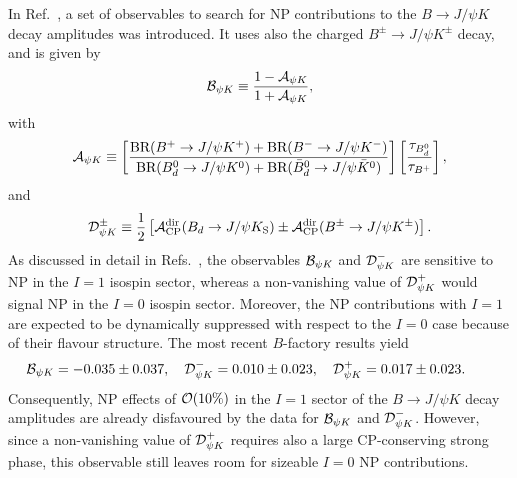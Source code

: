 \documentclass[12pt]{article}
\begin{document}
In Ref.~\cite{FM-BpsiK}, a set of observables to search for NP contributions to 
the $B\to J/\psi K $ decay amplitudes was introduced. It
uses also the charged $B^\pm\to J/\psi K^\pm$ decay, and is given by
\begin{equation}\label{BpsiK}
{\cal B}_{\psi K}\equiv \frac{1-{\cal A}_{\psi K}}{1+{\cal A}_{\psi K}}, 
\end{equation}
with
\begin{equation}\label{ApsiK-def}
{\cal A}_{\psi K}\equiv\left[\frac{\mbox{BR}(B^+\to J/\psi K^+)+
\mbox{BR}(B^-\to J/\psi K^-)}{\mbox{BR}(B^0_d\to J/\psi K^0)+
\mbox{BR}(\bar B^0_d\to J/\psi\bar K^0)}
\right]\left[\frac{\tau_{B^0_d}}{\tau_{B^+}}\right],
\end{equation}
and
\begin{equation}\label{DpmPsiK}
{\cal D}^\pm_{\psi K}\equiv\frac{1}{2}\left[
{\cal A}_{\rm CP}^{\rm dir}(B_d\to J/\psi K_{\rm S})\pm
{\cal A}_{\rm CP}^{\rm dir}(B^\pm\to J/\psi K^\pm)\right].
\end{equation}
As discussed in detail in Refs.~\cite{RF-Phys-Rep,FM-BpsiK}, 
the observables ${\cal B}_{\psi K}$ 
and ${\cal D}^-_{\psi K}$ are sensitive to NP in the $I=1$ isospin sector, 
whereas a non-vanishing value of ${\cal D}^+_{\psi K}$ would signal NP in the
$I=0$ isospin sector. Moreover, the NP contributions with $I=1$ are expected
to be dynamically suppressed with respect to the $I=0$ case because of their 
flavour structure. The most recent $B$-factory results yield
\begin{equation}\label{B-Dpm-PsiK-res}
\hspace*{-0.7truecm} {\cal B}_{\psi K} =-0.035\pm0.037,\quad
{\cal D}^-_{\psi K}=0.010\pm0.023, \quad
{\cal D}^+_{\psi K}=0.017\pm0.023.
\end{equation}
Consequently, NP effects of ${\cal O}(10\%)$ in the $I=1$ sector of the 
$B\to J/\psi K$ decay amplitudes are already disfavoured by the
data for ${\cal B}_{\psi K}$ and ${\cal D}^-_{\psi K}$. However, since a 
non-vanishing value of ${\cal D}^+_{\psi K}$ requires also a large CP-conserving 
strong phase, this observable still leaves room for sizeable  $I=0$ NP 
contributions.

%
%
%
\end{document}
